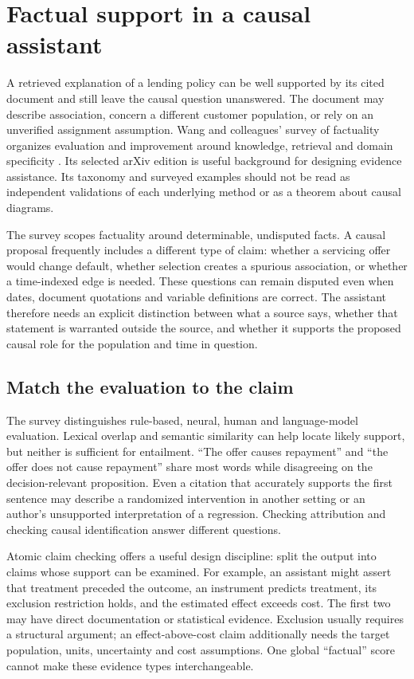 \section{Factual support in a causal assistant}
\label{exec22:fact-scope}

A retrieved explanation of a lending policy can be well supported by its cited
document and still leave the causal question unanswered. The document may
describe association, concern a different customer population, or rely on an
unverified assignment assumption. Wang and colleagues' survey of factuality
organizes evaluation and improvement around knowledge, retrieval and domain
specificity \citep{exec22_factuality_wang}. Its selected arXiv edition is useful
background for designing evidence assistance. Its taxonomy and surveyed
examples should not be read as independent validations of each underlying
method or as a theorem about causal diagrams.

The survey scopes factuality around determinable, undisputed facts. A causal
proposal frequently includes a different type of claim: whether a servicing
offer would change default, whether selection creates a spurious association,
or whether a time-indexed edge is needed. These questions can remain disputed
even when dates, document quotations and variable definitions are correct.
The assistant therefore needs an explicit distinction between what a source
says, whether that statement is warranted outside the source, and whether it
supports the proposed causal role for the population and time in question.

\subsection{Match the evaluation to the claim}

The survey distinguishes rule-based, neural, human and language-model
evaluation. Lexical overlap and semantic similarity can help locate likely
support, but neither is sufficient for entailment. ``The offer causes
repayment'' and ``the offer does not cause repayment'' share most words while
disagreeing on the decision-relevant proposition. Even a citation that
accurately supports the first sentence may describe a randomized intervention
in another setting or an author's unsupported interpretation of a regression.
Checking attribution and checking causal identification answer different
questions.

Atomic claim checking offers a useful design discipline: split the output into
claims whose support can be examined. For example, an assistant might assert
that treatment preceded the outcome, an instrument predicts treatment, its
exclusion restriction holds, and the estimated effect exceeds cost. The first
two may have direct documentation or statistical evidence. Exclusion usually
requires a structural argument; an effect-above-cost claim additionally needs
the target population, units, uncertainty and cost assumptions. One global
``factual'' score cannot make these evidence types interchangeable.


